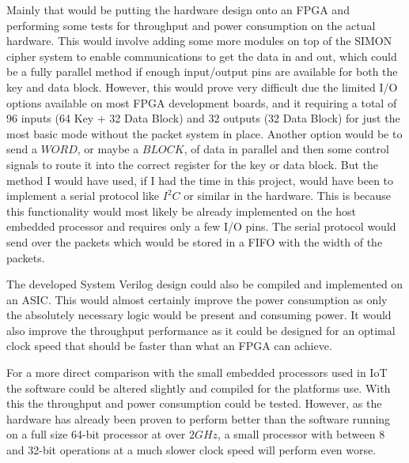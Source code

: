 \documentclass[12pt,twoside,a4paper]{report}
\begin{document}
	Mainly that would be putting the hardware design onto an FPGA and performing some tests for throughput and power consumption on the actual hardware. This would involve adding some more modules on top of the SIMON cipher system to enable communications to get the data in and out, which could be a fully parallel method if enough input/output pins are available for both the key and data block. However, this would prove very difficult due the limited I/O options available on most FPGA development boards, and it requiring a total of 96 inputs (64 Key + 32 Data Block) and 32 outputs (32 Data Block) for just the most basic mode without the packet system in place. Another option would be to send a $WORD$, or maybe a $BLOCK$, of data in parallel and then some control signals to route it into the correct register for the key or data block. But the method I would have used, if I had the time in this project, would have been to implement a serial protocol like $I^2C$ or similar in the hardware. This is because this functionality would most likely be already implemented on the host embedded processor and requires only a few I/O pins. The serial protocol would send over the packets which would be stored in a FIFO with the width of the packets.
	
	The developed System Verilog design could also be compiled and implemented on an ASIC. This would almost certainly improve the power consumption as only the absolutely necessary  logic would be present and consuming power. It would also improve the throughput performance as it could be designed for an optimal clock speed that should be faster than what an FPGA can achieve.
	
	For a more direct comparison with the small embedded processors used in IoT the software could be altered slightly and compiled for the platforms use. With this the throughput and power consumption could be tested. However, as the hardware has already been proven to perform better than the software running on a full size 64-bit processor at over $2GHz$, a small processor with between 8 and 32-bit operations at a much slower clock speed will perform even worse.
	
	
	

	\appendix    
\end{document}
